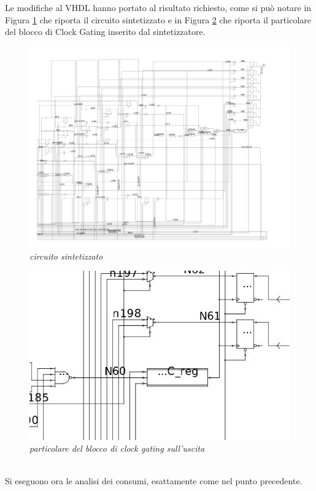 \noindent Le modifiche al VHDL hanno portato al risultato richiesto, come si può notare in Figura \ref{3_12} che riporta il circuito sintetizzato e in Figura \ref{3_13} che riporta il particolare del blocco di Clock Gating inserito dal sintetizzatore.
\\
\begin{figure}[!htb]
	\centering
	\includegraphics[scale=0.5]{immagini/3_12}
	\caption{\textit{circuito sintetizzato}}
	\label{3_12}
\end{figure}
\begin{figure}[!htb]
	\centering
	\includegraphics[scale=1.5]{immagini/3_13}
	\caption{\textit{particolare del blocco di clock gating sull'uscita}}
	\label{3_13}
\end{figure}
\\
Si eseguono ora le analisi dei consumi, esattamente come nel punto precedente.\\
